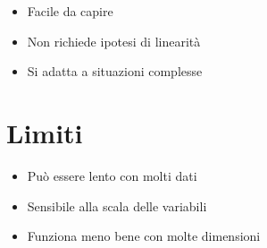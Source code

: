 \documentclass{article}
\begin{document}
	\begin{itemize}
		\item Facile da capire
		\item Non richiede ipotesi di linearità
		\item Si adatta a situazioni complesse
	\end{itemize}
	
	\section*{Limiti}
	
	\begin{itemize}
		\item Può essere lento con molti dati
		\item Sensibile alla scala delle variabili
		\item Funziona meno bene con molte dimensioni
	\end{itemize}
	
\end{document}
